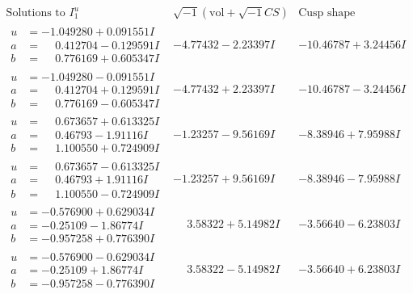 \documentclass[1p]{elsarticle_modified}
\theoremstyle{definition}
\newcommand{\I}{\sqrt{-1}}
\begin{document}
$$\begin{array}{c|c|c}  
\text{Solutions to }I^u_{1}& \I (\text{vol} + \sqrt{-1}CS) & \text{Cusp shape}\\
 \hline 
\begin{aligned}
u &= -1.049280 + 0.091551 I \\
a &= \phantom{-}0.412704 - 0.129591 I \\
b &= \phantom{-}0.776169 + 0.605347 I\end{aligned}
 & -4.77432 - 2.23397 I & -10.46787 + 3.24456 I \\ \hline\begin{aligned}
u &= -1.049280 - 0.091551 I \\
a &= \phantom{-}0.412704 + 0.129591 I \\
b &= \phantom{-}0.776169 - 0.605347 I\end{aligned}
 & -4.77432 + 2.23397 I & -10.46787 - 3.24456 I \\ \hline\begin{aligned}
u &= \phantom{-}0.673657 + 0.613325 I \\
a &= \phantom{-}0.46793 - 1.91116 I \\
b &= \phantom{-}1.100550 + 0.724909 I\end{aligned}
 & -1.23257 - 9.56169 I & -8.38946 + 7.95988 I \\ \hline\begin{aligned}
u &= \phantom{-}0.673657 - 0.613325 I \\
a &= \phantom{-}0.46793 + 1.91116 I \\
b &= \phantom{-}1.100550 - 0.724909 I\end{aligned}
 & -1.23257 + 9.56169 I & -8.38946 - 7.95988 I \\ \hline\begin{aligned}
u &= -0.576900 + 0.629034 I \\
a &= -0.25109 - 1.86774 I \\
b &= -0.957258 + 0.776390 I\end{aligned}
 & \phantom{-}3.58322 + 5.14982 I & -3.56640 - 6.23803 I \\ \hline\begin{aligned}
u &= -0.576900 - 0.629034 I \\
a &= -0.25109 + 1.86774 I \\
b &= -0.957258 - 0.776390 I\end{aligned}
 & \phantom{-}3.58322 - 5.14982 I & -3.56640 + 6.23803 I \\ \hline\begin{aligned}

\end{aligned}
\end{array}$$
\end{document}
